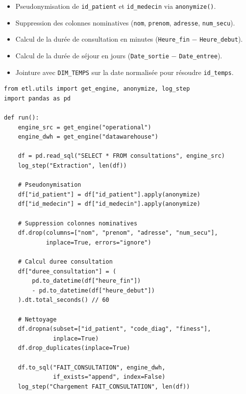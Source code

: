 \documentclass[12pt, a4paper]{report}
\begin{document}
\begin{itemize}[label=\textcolor{chuBlue}{\textbullet}]
\begin{itemize}[label=\textcolor{chuBlue}{\textbullet}]
  \item Pseudonymisation de \texttt{id\_patient} et \texttt{id\_medecin} via \texttt{anonymize()}.
  \item Suppression des colonnes nominatives (\texttt{nom}, \texttt{prenom}, \texttt{adresse}, \texttt{num\_secu}).
  \item Calcul de la durée de consultation en minutes (\texttt{Heure\_fin} $-$ \texttt{Heure\_debut}).
  \item Calcul de la durée de séjour en jours (\texttt{Date\_sortie} $-$ \texttt{Date\_entree}).
  \item Jointure avec \texttt{DIM\_TEMPS} sur la date normalisée pour résoudre \texttt{id\_temps}.
\end{itemize}

\begin{lstlisting}[style=python, caption={Job 1 -- pseudonymisation et nettoyage des données cliniques}, label={lst:job1}]
from etl.utils import get_engine, anonymize, log_step
import pandas as pd

def run():
    engine_src = get_engine("operational")
    engine_dwh = get_engine("datawarehouse")

    df = pd.read_sql("SELECT * FROM consultations", engine_src)
    log_step("Extraction", len(df))

    # Pseudonymisation
    df["id_patient"] = df["id_patient"].apply(anonymize)
    df["id_medecin"] = df["id_medecin"].apply(anonymize)

    # Suppression colonnes nominatives
    df.drop(columns=["nom", "prenom", "adresse", "num_secu"],
            inplace=True, errors="ignore")

    # Calcul duree consultation
    df["duree_consultation"] = (
        pd.to_datetime(df["heure_fin"])
        - pd.to_datetime(df["heure_debut"])
    ).dt.total_seconds() // 60

    # Nettoyage
    df.dropna(subset=["id_patient", "code_diag", "finess"],
              inplace=True)
    df.drop_duplicates(inplace=True)

    df.to_sql("FAIT_CONSULTATION", engine_dwh,
              if_exists="append", index=False)
    log_step("Chargement FAIT_CONSULTATION", len(df))
\end{lstlisting}



\end{itemize}
\end{document}
